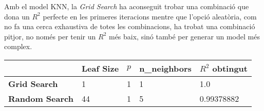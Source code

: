 \documentclass[a4paper, 11pt]{article}
\begin{document}
        Amb el model KNN, la \textit{Grid Search} ha aconseguit trobar una combinació que dona un $R^2$ perfecte en les primeres iteracions mentre que l'opció aleatòria, com no fa una cerca exhaustiva de totes les combinacions, ha trobat una combinació pitjor, no només per tenir un $R^2$ més baix, sinó també per generar un model més complex.
        \begin{table}[H]
            \centering
            \begin{tabular}{|l|l|l|l|l|}
            \hline
            \textbf{}              & \textbf{Leaf Size} & \textbf{$p$} & \textbf{n\_neighbors} & \textbf{$R^2$ obtingut} \\ \hline
            \textbf{Grid Search}   & 1                  & 1            & 1                     & 1.0                       \\ \hline
            \textbf{Random Search} & 44                 & 1            & 5                     & 0.99378882              \\ \hline
            \end{tabular}
        \end{table}
\end{document}
